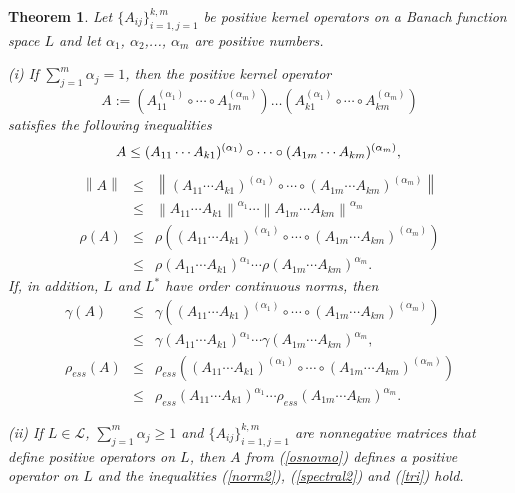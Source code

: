 \documentclass[12pt, reqno]{amsart}
\newtheorem{theorem}{Theorem}[section]
\theoremstyle{definition}
\theoremstyle{remark}
\numberwithin{equation}{section}
\newcommand{\be}{\begin{equation}}
\newcommand{\ee}{\end{equation}}
\begin{document}
\begin{theorem}
\label{thbegin}
Let $\{A_{i j}\}_{i=1, j=1}^{k, m}$ be positive kernel operators on a Banach function space $L$ and let $\alpha _1$, $\alpha _2$,..., $\alpha _m$ are positive numbers.

\noindent (i) If %
$\sum_{j=1}^{m} \alpha _j = 1$, then the positive kernel operator
\be
A:= \left(A_{1 1}^{(\alpha _1)} \circ \cdots \circ A_{1 m}^{(\alpha _m)}\right) \ldots \left(A_{k 1}^{(\alpha _1)} \circ \cdots \circ A_{k m}^{(\alpha _m)} \right)
\label{osnovno}
\ee
satisfies the following inequalities
\begin{equation}
A \le
(A_{1 1} \cdots  A_{k 1})^{(\alpha _1)} \circ \cdots
\circ (A_{1 m} \cdots A_{k m})^{(\alpha _m)} , \\
\label{norm2}
\end{equation}
\begin{eqnarray}
\nonumber
\left\|A \right\| &\le &\left\|(A_{1 1} \cdots  A_{k 1})^{(\alpha _1)} \circ \cdots
\circ (A_{1 m} \cdots A_{k m})^{(\alpha _m)} \right\|\\
&\le&\left\|A_{1 1} \cdots  A_{k 1}\right\|^{\alpha _1}\cdots\left\|A_{1 m} \cdots  A_{k m}\right\|^{\alpha _m}
\label{spectral2}
\end{eqnarray}
\begin{eqnarray}
\nonumber
\rho \left(A \right)& \le &\rho \left((A_{1 1} \cdots  A_{k 1})^{(\alpha _1)} \circ \cdots
\circ (A_{1 m} \cdots A_{k m})^{(\alpha _m)}\right)\\
&\le&\rho \left( A_{1 1} \cdots  A_{k 1} \right)^{\alpha _1} \cdots
\rho \left( A_{1 m} \cdots A_{k m}\right)^{\alpha _m} .
\label{tri}
\end{eqnarray}
If, in addition, $L$ and $L^*$ have order continuous norms, then%
\begin{eqnarray}
\nonumber
\gamma (A) & \le &\gamma \left((A_{1 1} \cdots  A_{k 1})^{(\alpha _1)} \circ \cdots
\circ (A_{1 m} \cdots A_{k m})^{(\alpha _m)}\right)\\
 &\le &
 \label{meas_noncomp}
\gamma (A_{1 1} \cdots  A_{k 1})^{\alpha _1} \cdots \gamma(A_{1 m} \cdots A_{k m})^{\alpha _m}, \\
\nonumber
\rho _{ess} \left(A \right) & \le &\rho _{ess} \left((A_{1 1} \cdots  A_{k 1})^{(\alpha _1)} \circ \cdots
\circ (A_{1 m} \cdots A_{k m})^{(\alpha _m)}\right)\\
&\le  &
\label{ess_spectral}
\rho _{ess} \left( A_{1 1} \cdots  A_{k 1} \right)^{\alpha _1} \cdots
\rho _{ess} \left( A_{1 m} \cdots A_{k m}\right)^{\alpha _m} .
\end{eqnarray}


\noindent(ii) If $L\in\mathcal L$, $\sum_{j=1}^{m} \alpha _j\ge 1$ and $\{A_{i j}\}_{i=1, j=1}^{k, m}$ are nonnegative matrices that define positive operators on $L$, then $A$ from (\ref{osnovno}) defines a  positive operator on $L$ and the inequalities (\ref{norm2}), (\ref{spectral2}) and (\ref{tri}) hold.
\label{DBPfs}
\end{theorem}
\end{document}
